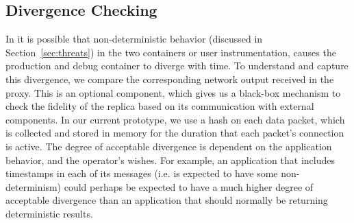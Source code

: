 
\subsection{Divergence Checking}
\label{sec:divergenceChecking}

In \parikshan it is possible that non-deterministic behavior (discussed in Section~\ref{sec:threats}) in the two containers or user instrumentation, causes the production and debug container to diverge with time.
To understand and capture this divergence, we compare the corresponding network output received in the proxy.
This is an optional component, which gives us a black-box mechanism to check the fidelity of the replica based on its communication with external components.
In our current prototype, we use a hash on each data packet, which is collected and stored in memory for the duration that each packet's connection is active.
The degree of acceptable divergence is dependent on the application behavior, and the operator's wishes. 
For example, an application that includes timestamps in each of its messages (i.e. is expected to have some non-determinism) could perhaps be expected to have a much higher degree of acceptable divergence than an application that should normally be returning deterministic results.
